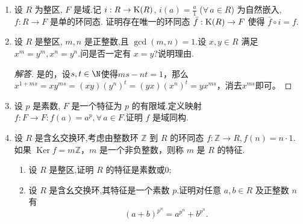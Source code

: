 \begin{enumerate}

\item 设 $ R $ 为整区, $ F $ 是域.记 $ i : R \to {\rm K}(R) $, 
$ i(a) = \frac{a}{1} $ ($ \forall \, a \in R $) 为自然嵌入, $f : R \to F$ 是单的环同态.
证明存在唯一的环同态 $ \bar{f} : {\rm K}(R) \to F $ 使得 $\bar{f} \circ i = f$.

\item 设 $ R $ 是整区, $ m, n $ 是正整数,且 $ \gcd(m, n) = 1 $.设 $ x, y \in R $ 满足 $ x^m = y^m, x^n = y^n $.问是否一定有 $ x = y $?说明理由.
\begin{proof}[解答]
    是的，设$s,t\in\N$使得$ms-nt=1$，那么$x^{1+ms}=xy^{ms}=(xy)(y^n)^t=(yx)(x^n)^t=yx^{ms}$，消去$x^{ms}$即可。
\end{proof}

\item 设 $ p $ 是素数, $ F $ 是一个特征为 $ p $ 的有限域.定义映射 $ f : F \rightarrow F: f(a) = a^p, \forall \, a \in F $.证明 $ f $ 是域同构.

\item 设 $ R $ 是含幺交换环,考虑由整数环 $ \mathbb{Z} $ 到 $ R $ 的环同态 $ f : \mathbb{Z} \rightarrow R, f(n) = n \cdot 1 $.
如果 $\operatorname{Ker} f = m\mathbb{Z}$，$m$ 是一个非负整数，则称 $m$ 是 $R$ 的特征.
\begin{enumerate}[label=(\arabic*)]
    \item 设 $ R $ 是整区,证明 $ R $ 的特征是素数或$0$;
    \item 设 $ R $ 是含幺交换环,其特征是一个素数 $ p $.证明对任意 $ a, b \in R $ 及正整数 $ n $ 有
    \[ (a + b)^{p^n} = a^{p^n} + b^{p^n}. \]
\end{enumerate}


\end{enumerate}
